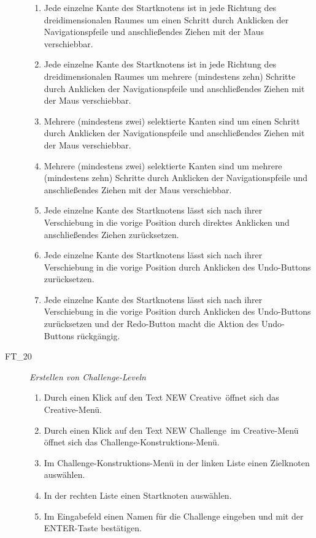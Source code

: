 \begin{description}
\begin{enumerate}
		\item Jede einzelne Kante des Startknotens ist in jede Richtung des dreidimensionalen Raumes um einen Schritt durch Anklicken der Navigationspfeile und anschließendes Ziehen mit der Maus verschiebbar.
		\item Jede einzelne Kante des Startknotens ist in jede Richtung des dreidimensionalen Raumes um mehrere (mindestens zehn) Schritte durch Anklicken der Navigationspfeile und anschließendes Ziehen mit der Maus verschiebbar.
		\item Mehrere (mindestens zwei) selektierte Kanten sind um einen Schritt durch Anklicken der Navigationspfeile und anschließendes Ziehen mit der Maus verschiebbar.
		\item Mehrere (mindestens zwei) selektierte Kanten sind um mehrere (mindestens zehn) Schritte durch Anklicken der Navigationspfeile und anschließendes Ziehen mit der Maus verschiebbar.
		
		\item Jede einzelne Kante des Startknotens lässt sich nach ihrer Verschiebung in die vorige Position durch direktes Anklicken und anschließendes Ziehen zurücksetzen.
		\item Jede einzelne Kante des Startknotens lässt sich nach ihrer Verschiebung in die vorige Position durch Anklicken des \glqq Undo\grqq-Buttons zurücksetzen.
		\item Jede einzelne Kante des Startknotens lässt sich nach ihrer Verschiebung in die vorige Position durch Anklicken des \glqq Undo\grqq-Buttons zurücksetzen und der \glqq Redo\grqq-Button macht die Aktion des \glqq Undo\grqq-Buttons rückgängig.
		~\\
	
	\end{enumerate}
	
	
	\item[FT\_20] \textit{Erstellen von Challenge-Leveln} \hfill\\
	
	\label{FT:20}
	
	\begin{enumerate}
	
		\item Durch einen Klick auf den Text \glqq NEW Creative\grqq~öffnet sich das Creative-Menü.
		\item Durch einen Klick auf den Text \glqq NEW Challenge\grqq~im Creative-Menü öffnet sich das Challenge-Konstruktions-Menü.
		\item Im Challenge-Konstruktions-Menü in der linken Liste einen Zielknoten auswählen.
		\item In der rechten Liste einen Startknoten auswählen.
		\item Im Eingabefeld einen Namen für die Challenge eingeben und mit der \glqq ENTER\grqq-Taste bestätigen.
		~\\
		

\end{enumerate}
\end{description}
